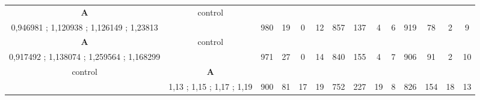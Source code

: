 \begin{table}[]
{\begin{tabular}{|c|c|c|c|c|c|c|c|c|c|c|c|c|c|}
\cellcolor{blue!15}\textbf{A} & control& {\color[HTML]{00009B} } & {\color[HTML]{9A0000} } & {\color[HTML]{009901} } &  & {\color[HTML]{00009B} } & {\color[HTML]{9A0000} } & {\color[HTML]{009901} } &  & {\color[HTML]{00009B} } & {\color[HTML]{9A0000} } & {\color[HTML]{009901} } &  \\ 
\cellcolor{ blue!15}0,946981 ; 1,120938 ; 1,126149 ; 1,23813 &  & \multirow{-2}{*}{{\color[HTML]{00009B} 980}} & \multirow{-2}{*}{{\color[HTML]{9A0000} 19}} & \multirow{-2}{*}{{\color[HTML]{009901} 0}} & \multirow{-2}{*}{12} & \multirow{-2}{*}{{\color[HTML]{00009B} 857}} & \multirow{-2}{*}{{\color[HTML]{9A0000} 137}} & \multirow{-2}{*}{{\color[HTML]{009901} 4}} & \multirow{-2}{*}{6} & \multirow{-2}{*}{{\color[HTML]{00009B} 919}} & \multirow{-2}{*}{{\color[HTML]{9A0000} 78}} & \multirow{-2}{*}{{\color[HTML]{009901} 2}} & \multirow{-2}{*}{9} \\ \hline

\cellcolor{blue!15}\textbf{A} & control& {\color[HTML]{00009B} } & {\color[HTML]{9A0000} } & {\color[HTML]{009901} } &  & {\color[HTML]{00009B} } & {\color[HTML]{9A0000} } & {\color[HTML]{009901} } &  & {\color[HTML]{00009B} } & {\color[HTML]{9A0000} } & {\color[HTML]{009901} } &  \\ 
\cellcolor{ blue!15}0,917492 ; 1,138074 ; 1,259564 ; 1,168299 &  & \multirow{-2}{*}{{\color[HTML]{00009B} 971}} & \multirow{-2}{*}{{\color[HTML]{9A0000} 27}} & \multirow{-2}{*}{{\color[HTML]{009901} 0}} & \multirow{-2}{*}{14} & \multirow{-2}{*}{{\color[HTML]{00009B} 840}} & \multirow{-2}{*}{{\color[HTML]{9A0000} 155}} & \multirow{-2}{*}{{\color[HTML]{009901} 4}} & \multirow{-2}{*}{7} & \multirow{-2}{*}{{\color[HTML]{00009B} 906}} & \multirow{-2}{*}{{\color[HTML]{9A0000} 91}} & \multirow{-2}{*}{{\color[HTML]{009901} 2}} & \multirow{-2}{*}{10} \\ \hline

control & \cellcolor{blue!15}\textbf{A}& {\color[HTML]{00009B} } & {\color[HTML]{9A0000} } & {\color[HTML]{009901} } &  & {\color[HTML]{00009B} } & {\color[HTML]{9A0000} } & {\color[HTML]{009901} } &  & {\color[HTML]{00009B} } & {\color[HTML]{9A0000} } & {\color[HTML]{009901} } &  \\ 
 & \cellcolor{ blue!15}1,13 ; 1,15 ; 1,17 ; 1,19 & \multirow{-2}{*}{{\color[HTML]{00009B} 900}} & \multirow{-2}{*}{{\color[HTML]{9A0000} 81}} & \multirow{-2}{*}{{\color[HTML]{009901} 17}} & \multirow{-2}{*}{19} & \multirow{-2}{*}{{\color[HTML]{00009B} 752}} & \multirow{-2}{*}{{\color[HTML]{9A0000} 227}} & \multirow{-2}{*}{{\color[HTML]{009901} 19}} & \multirow{-2}{*}{8} & \multirow{-2}{*}{{\color[HTML]{00009B} 826}} & \multirow{-2}{*}{{\color[HTML]{9A0000} 154}} & \multirow{-2}{*}{{\color[HTML]{009901} 18}} & \multirow{-2}{*}{13} \\ \hline


\end{tabular}}
\end{table}
